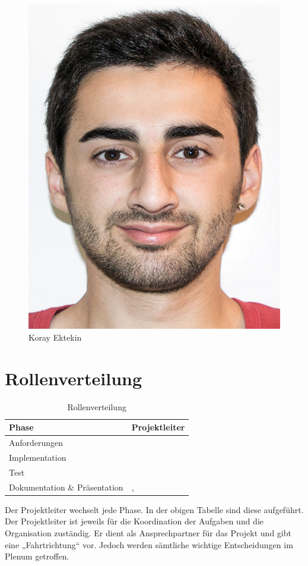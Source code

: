 \begin{figure}[htb]
\begin{minipage}{0.45\linewidth}
		\includegraphics[scale=0.9]{content/pictures/Koray.jpg}
		\caption{Koray Ektekin}
		\vspace{30pt}
	\end{minipage}
\end{figure}
\section{Rollenverteilung}
\begin{table}[h]
\centering
	\begin{tabular}{l|l}
		\toprule
		\textbf{Phase}& \textbf{Projektleiter}\\
		\midrule
		Anforderungen & \docDritterReferent 	\\ 
		Implementation& \docErsterReferent	\\
		Test		  & \docZweiterReferent	\\ 
		Dokumentation \& Präsentation	& \docVierterReferent, \docFuenfterReferent\\
		\bottomrule
	\end{tabular}
	\caption{Rollenverteilung}
\end{table}
\noindent 
Der Projektleiter wechselt jede Phase. In der obigen Tabelle sind diese aufgeführt.
Der Projektleiter ist jeweils für die Koordination der Aufgaben und die
Organisation zuständig. Er dient als Ansprechpartner für das Projekt und gibt
eine „Fahrtrichtung“ vor. Jedoch werden sämtliche wichtige Entscheidungen
im Plenum getroffen. 
